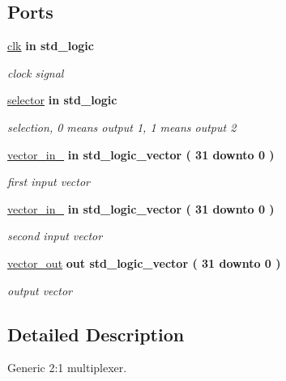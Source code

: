 \subsection*{\-Ports}
 \begin{DoxyCompactItemize}
\item 
\hyperlink{class_m_u_x_a70f7f9ef1e412f6da35c2b9e17540895}{clk}  {\bfseries {\bfseries in }} {\bfseries std\-\_\-logic } 
\begin{DoxyCompactList}\small\item\em clock signal \end{DoxyCompactList}\item 
\hyperlink{class_m_u_x_a9819d657d3d033c5c4ffe99e31b79bb2}{selector}  {\bfseries {\bfseries in }} {\bfseries std\-\_\-logic } 
\begin{DoxyCompactList}\small\item\em selection, 0 means output 1, 1 means output 2 \end{DoxyCompactList}\item 
\hyperlink{class_m_u_x_adbc4a8307f6b8e70f215db699745f990}{vector\-\_\-in\-\_}  {\bfseries {\bfseries in }} {\bfseries std\-\_\-logic\-\_\-vector (   31    downto    0  ) } 
\begin{DoxyCompactList}\small\item\em first input vector \end{DoxyCompactList}\item 
\hyperlink{class_m_u_x_aa66f7828cd4605fa3a26337c456221b1}{vector\-\_\-in\-\_}  {\bfseries {\bfseries in }} {\bfseries std\-\_\-logic\-\_\-vector (   31    downto    0  ) } 
\begin{DoxyCompactList}\small\item\em second input vector \end{DoxyCompactList}\item 
\hyperlink{class_m_u_x_aba4981bcab558ff1bfef133843d39d43}{vector\-\_\-out}  {\bfseries {\bfseries out }} {\bfseries std\-\_\-logic\-\_\-vector (   31    downto    0  ) } 
\begin{DoxyCompactList}\small\item\em output vector \end{DoxyCompactList}\end{DoxyCompactItemize}


\subsection{\-Detailed \-Description}
\-Generic 2\-:1 multiplexer. 

